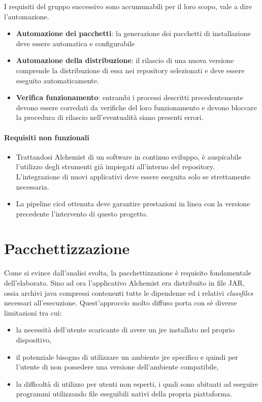I requisiti del gruppo successivo sono accumunabili per il loro scopo, vale a dire l'automazione.

\begin{itemize}
	\item \textbf{Automazione dei pacchetti}: la generazione dei pacchetti di installazione deve essere automatica e configurabile
	\item \textbf{Automazione della distribuzione}: il rilascio di una nuova versione comprende la distribuzione di essa nei repository selezionati e deve essere eseguito automaticamente.
	\item \textbf{Verifica funzionamento}: entrambi i processi descritti precedentemente devono essere corredati da verifiche del loro funzionamento e devono bloccare la procedura di rilascio nell'eventualità siano presenti errori.
\end{itemize}

\paragraph{Requisiti non funzionali}

\begin{itemize}
	\item Trattandosi Alchemist di un software in continuo sviluppo, è auspicabile l'utilizzo degli strumenti già impiegati all'interno del repository. \\ L'integrazione di nuovi applicativi deve essere eseguita solo se strettamente necessaria.
	\item La pipeline \ac{cicd} ottenuta deve garantire prestazioni in linea con la versione precedente l'intervento di questo progetto.
\end{itemize}

\section{Pacchettizzazione}\label{sec:packaging}

Come si evince dall'analisi svolta, la pacchettizzazione è requisito fondamentale dell'elaborato. Sino ad ora l'applicativo Alchemist era distribuito in file JAR, ossia archivi java compressi contenenti tutte le dipendenze ed i relativi \textit{classfiles} necessari all'esecuzione. Quest'approccio molto diffuso porta con sè diverse limitazioni tra cui:
\begin{itemize}
	\item la necessità dell'utente scaricante di avere un \ac{jre} installato nel proprio dispositivo,
	\item il potenziale bisogno di utilizzare un ambiente \ac{jre} specifico e quindi per l'utente di non possedere una versione dell'ambiente compatibile,
	\item la difficoltà di utilizzo per utenti non esperti, i quali sono abituati ad eseguire programmi utilizzando file eseguibili nativi della propria piattaforma.
\end{itemize}

